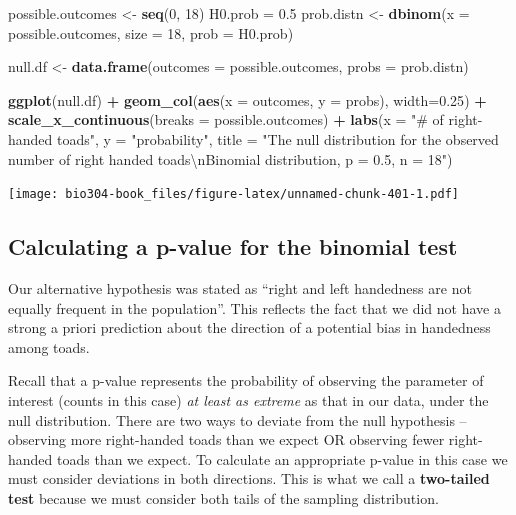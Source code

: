 \documentclass[]{book}
\newenvironment{Shaded}{\begin{snugshade}}{\end{snugshade}}
\newcommand{\CharTok}[1]{\textcolor[rgb]{0.31,0.60,0.02}{#1}}
\newcommand{\DataTypeTok}[1]{\textcolor[rgb]{0.13,0.29,0.53}{#1}}
\newcommand{\DecValTok}[1]{\textcolor[rgb]{0.00,0.00,0.81}{#1}}
\newcommand{\FloatTok}[1]{\textcolor[rgb]{0.00,0.00,0.81}{#1}}
\newcommand{\KeywordTok}[1]{\textcolor[rgb]{0.13,0.29,0.53}{\textbf{#1}}}
\newcommand{\NormalTok}[1]{#1}
\newcommand{\OperatorTok}[1]{\textcolor[rgb]{0.81,0.36,0.00}{\textbf{#1}}}
\newcommand{\StringTok}[1]{\textcolor[rgb]{0.31,0.60,0.02}{#1}}
\theoremstyle{definition}
\theoremstyle{definition}
\theoremstyle{definition}
\theoremstyle{remark}
\begin{document}
\begin{Shaded}
\begin{Highlighting}[]
\NormalTok{possible.outcomes <-}\StringTok{ }\KeywordTok{seq}\NormalTok{(}\DecValTok{0}\NormalTok{, }\DecValTok{18}\NormalTok{)}
\NormalTok{H0.prob =}\StringTok{ }\FloatTok{0.5}
\NormalTok{prob.distn <-}\StringTok{ }\KeywordTok{dbinom}\NormalTok{(}\DataTypeTok{x =}\NormalTok{ possible.outcomes, }\DataTypeTok{size =} \DecValTok{18}\NormalTok{, }\DataTypeTok{prob =}\NormalTok{ H0.prob)}

\NormalTok{null.df <-}\StringTok{ }\KeywordTok{data.frame}\NormalTok{(}\DataTypeTok{outcomes =}\NormalTok{ possible.outcomes, }\DataTypeTok{probs =}\NormalTok{ prob.distn)}

\KeywordTok{ggplot}\NormalTok{(null.df) }\OperatorTok{+}\StringTok{ }
\StringTok{  }\KeywordTok{geom_col}\NormalTok{(}\KeywordTok{aes}\NormalTok{(}\DataTypeTok{x =}\NormalTok{ outcomes, }\DataTypeTok{y =}\NormalTok{ probs), }\DataTypeTok{width=}\FloatTok{0.25}\NormalTok{) }\OperatorTok{+}\StringTok{ }
\StringTok{  }\KeywordTok{scale_x_continuous}\NormalTok{(}\DataTypeTok{breaks =}\NormalTok{ possible.outcomes) }\OperatorTok{+}
\StringTok{  }\KeywordTok{labs}\NormalTok{(}\DataTypeTok{x =} \StringTok{"# of right-handed toads"}\NormalTok{, }\DataTypeTok{y =} \StringTok{"probability"}\NormalTok{,}
       \DataTypeTok{title =} \StringTok{"The null distribution for the observed number of right handed toads}\CharTok{\textbackslash{}n}\StringTok{Binomial distribution, p = 0.5, n = 18"}\NormalTok{)}
\end{Highlighting}
\end{Shaded}

\texttt{[image: bio304-book\_files/figure-latex/unnamed-chunk-401-1.pdf]}

\hypertarget{calculating-a-p-value-for-the-binomial-test}{%
\subsection{Calculating a p-value for the binomial
test}\label{calculating-a-p-value-for-the-binomial-test}}

Our alternative hypothesis was stated as ``right and left handedness are
not equally frequent in the population''. This reflects the fact that we
did not have a strong a priori prediction about the direction of a
potential bias in handedness among toads.

Recall that a p-value represents the probability of observing the
parameter of interest (counts in this case) \emph{at least as extreme}
as that in our data, under the null distribution. There are two ways to
deviate from the null hypothesis -- observing more right-handed toads
than we expect OR observing fewer right-handed toads than we expect. To
calculate an appropriate p-value in this case we must consider
deviations in both directions. This is what we call a \textbf{two-tailed
test} because we must consider both tails of the sampling distribution.
\end{document}
